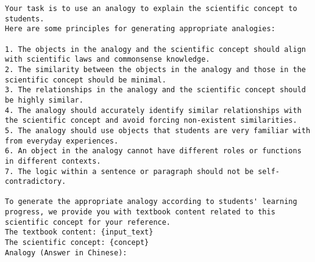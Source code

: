 
\begin{lstlisting}[caption={The revised prompt templates for GPT-4 to generate analogies.},label=lst:analogy_generation_prompt_revise]
Your task is to use an analogy to explain the scientific concept to students. 
Here are some principles for generating appropriate analogies:

1. The objects in the analogy and the scientific concept should align with scientific laws and commonsense knowledge.
2. The similarity between the objects in the analogy and those in the scientific concept should be minimal.
3. The relationships in the analogy and the scientific concept should be highly similar.
4. The analogy should accurately identify similar relationships with the scientific concept and avoid forcing non-existent similarities.
5. The analogy should use objects that students are very familiar with from everyday experiences.
6. An object in the analogy cannot have different roles or functions in different contexts.
7. The logic within a sentence or paragraph should not be self-contradictory.

To generate the appropriate analogy according to students' learning progress, we provide you with textbook content related to this scientific concept for your reference.
The textbook content: {input_text}
The scientific concept: {concept}
Analogy (Answer in Chinese):
\end{lstlisting}